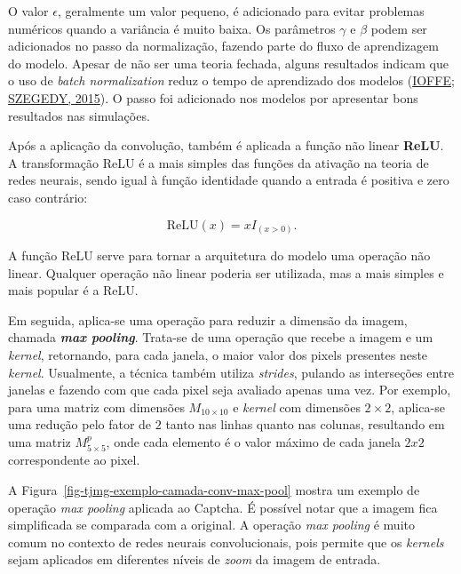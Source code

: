 \documentclass[12pt,twoside,brazilian]{book}
\begin{document}
O valor \(\epsilon\), geralmente um valor pequeno, é adicionado para
evitar problemas numéricos quando a variância é muito baixa. Os
parâmetros \(\gamma\) e \(\beta\) podem ser adicionados no passo da
normalização, fazendo parte do fluxo de aprendizagem do modelo. Apesar
de não ser uma teoria fechada, alguns resultados indicam que o uso de
\emph{batch normalization} reduz o tempo de aprendizado dos modelos
(\protect\hyperlink{ref-ioffe2015}{IOFFE; SZEGEDY, 2015}). O passo foi
adicionado nos modelos por apresentar bons resultados nas simulações.

Após a aplicação da convolução, também é aplicada a função não linear
\textbf{ReLU}. A transformação ReLU é a mais simples das funções da
ativação na teoria de redes neurais, sendo igual à função identidade
quando a entrada é positiva e zero caso contrário:

\[
\text{ReLU}(x) = xI_{(x>0)}.
\]

A função ReLU serve para tornar a arquitetura do modelo uma operação não
linear. Qualquer operação não linear poderia ser utilizada, mas a mais
simples e mais popular é a ReLU.

Em seguida, aplica-se uma operação para reduzir a dimensão da imagem,
chamada \textbf{\emph{max pooling}}. Trata-se de uma operação que recebe
a imagem e um \emph{kernel}, retornando, para cada janela, o maior valor
dos pixels presentes neste \emph{kernel}. Usualmente, a técnica também
utiliza \emph{strides}, pulando as interseções entre janelas e fazendo
com que cada pixel seja avaliado apenas uma vez. Por exemplo, para uma
matriz com dimensões \(M_{10\times10}\) e \emph{kernel} com dimensões
\(2\times2\), aplica-se uma redução pelo fator de \(2\) tanto nas linhas
quanto nas colunas, resultando em uma matriz \(M^p_{5\times5}\), onde
cada elemento é o valor máximo de cada janela \(2x2\) correspondente ao
pixel.

A Figura~\ref{fig-tjmg-exemplo-camada-conv-max-pool} mostra um exemplo
de operação \emph{max pooling} aplicada ao Captcha. É possível notar que
a imagem fica simplificada se comparada com a original. A operação
\emph{max pooling} é muito comum no contexto de redes neurais
convolucionais, pois permite que os \emph{kernels} sejam aplicados em
diferentes níveis de \emph{zoom} da imagem de entrada.
\end{document}
